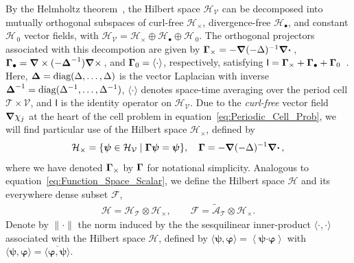 \documentclass[leqno,onefignum,onetabnum]{siamltex1213}
\newcommand{\Tc}{\mathcal{T}}
\newcommand{\Vc}{\mathcal{V}}
\newcommand{\Hc}{\mathcal{H}}
\newcommand{\Fc}{\mathcal{F}}
\newcommand{\Ac}{\mathcal{A}}
\newcommand{\Ib}{\mathsf{I}}
\newcommand\bDelta{\mbox{\boldmath${\Delta}$}}
\newcommand\bGamma{\mbox{\boldmath${\Gamma}$}}
\newcommand\bnabla{\mbox{\boldmath${\nabla}$}}
\providecommand\bcdot{\boldsymbol{\cdot}}
\newcommand{\vecpsi}{\boldsymbol{\psi}}
\newcommand{\vecvarphi}{\boldsymbol{\varphi}}
\begin{document}
By the Helmholtz theorem~\cite{Denaro:2003:0271,Bhatia:IEE:1077}, the
Hilbert space $\Hc_{\Vc}$ can be decomposed into mutually orthogonal
subspaces of curl-free $\Hc_\times$, divergence-free $\Hc_\bullet$, and constant
$\Hc_{\,0}$ vector fields, with $\Hc_{\Vc}=\Hc_\times\oplus\Hc_\bullet\oplus\Hc_{\,0}$.  The orthogonal projectors associated with this decompotion are given by 
$\bGamma_\times=-\bnabla(-\Delta)^{-1}\bnabla \bcdot\,$,
$\bGamma_\bullet=\bnabla\times(-\bDelta^{-1})\bnabla \times\,$, and $\bGamma_0=\langle\cdot\rangle$, 
respectively, satisfying
$\Ib=\bGamma_\times+\bGamma_\bullet+\bGamma_0$~\cite{Fannjiang:1994:SIAM_JAM:333,MILTON:2002:TC}. Here, 
$\bDelta=\text{diag}(\Delta,\ldots,\Delta)$ is the vector Laplacian with inverse
$\bDelta^{-1}=\text{diag}(\Delta^{-1},\ldots,\Delta^{-1})$, $\langle\cdot\rangle$ denotes space-time
averaging over the period cell $\Tc\times\Vc$, and $\Ib$ is the identity
operator on $\Hc_{\Vc}$. Due to the \emph{curl-free} vector field
$\bnabla\chi_j$ at the heart of the cell problem in
equation~\eqref{eq:Periodic_Cell_Prob}, we will find particular use of
the Hilbert space $\Hc_\times$, defined by 
%
\begin{align}\label{eq:Hilbert_Curl_Free}
  \Hc_\times=\{\vecpsi\in\Hc_{\Vc} \; | \; \bGamma\vecpsi=\vecpsi\},
  \quad
  \bGamma=-\bnabla(-\Delta)^{-1}\bnabla \bcdot\,,
\end{align}
%
where we have denoted $\bGamma_\times$ by $\bGamma$ for notational
simplicity. Analogous to equation~\eqref{eq:Function_Space_Scalar}, we
define the Hilbert space $\Hc$ and its everywhere dense subset $\Fc$,  
%
\begin{align}\label{eq:Function_Space_Vector} 
  \Hc=\Hc_{\Tc}\otimes\Hc_\times,  \qquad
  \Fc=\tilde{\Ac}_{\Tc}\otimes\Hc_\times.
\end{align}
%
Denote by $\|\cdot\|$ the norm induced by the the sesquilinear
inner-product $\langle\cdot,\cdot\rangle$ associated with the Hilbert space $\Hc$,
defined by $\langle\vecpsi,\vecvarphi\rangle=\left\langle\vecpsi\bcdot\vecvarphi\right\rangle$
with $\langle\vecpsi,\vecvarphi\rangle=\overline{\langle\vecvarphi,\vecpsi\rangle}$.  
\end{document}
